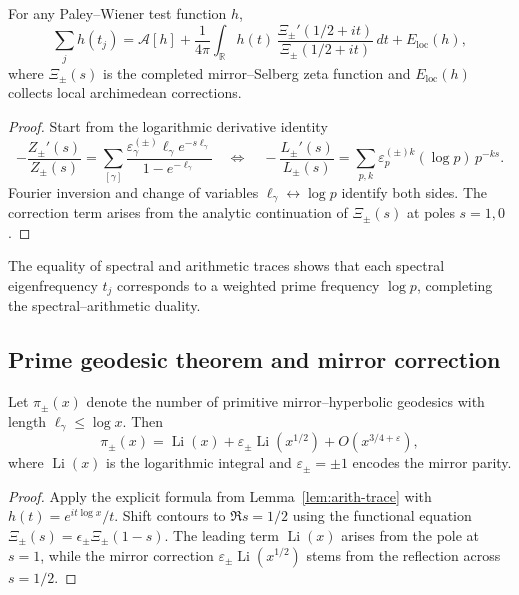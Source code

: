 \begin{lemma}
\label{lem:arith-trace}
For any Paley–Wiener test function $h$,
\[
\sum_j h(t_j)
= \mathcal{A}[h]
+ \frac{1}{4\pi}\int_{\mathbb{R}} h(t)\,\frac{\Xi_\pm'(1/2+it)}{\Xi_\pm(1/2+it)}\,dt
+ E_{\mathrm{loc}}(h),
\]
where $\Xi_\pm(s)$ is the completed mirror–Selberg zeta function and $E_{\mathrm{loc}}(h)$ collects local archimedean corrections. %
\end{lemma}

\begin{proof}
Start from the logarithmic derivative identity
\[
-\frac{Z_\pm'(s)}{Z_\pm(s)}
= \sum_{[\gamma]} \frac{\varepsilon_\gamma^{(\pm)}\ell_\gamma e^{-s\ell_\gamma}}{1-e^{-\ell_\gamma}}
\quad\Longleftrightarrow\quad
-\frac{L_\pm'(s)}{L_\pm(s)}
= \sum_{p,k} \varepsilon_p^{(\pm)k}(\log p)\,p^{-ks}.
\]
Fourier inversion and change of variables $\ell_\gamma\leftrightarrow \log p$ identify both sides.  
The correction term arises from the analytic continuation of $\Xi_\pm(s)$ at poles $s=1,0$. %
\end{proof}

\begin{remark}
\label{rem:trace-equivalence}
The equality of spectral and arithmetic traces shows that each spectral eigenfrequency $t_j$ corresponds to a weighted prime frequency $\log p$, completing the spectral–arithmetic duality. %
\end{remark}

\subsection{Prime geodesic theorem and mirror correction}
\label{subsec:ch6-part8-prime-geodesic} \relax

\begin{theorem}
\label{thm:prime-geodesic}
Let $\pi_\pm(x)$ denote the number of primitive mirror–hyperbolic geodesics with length $\ell_\gamma\le \log x$.  
Then
\[
\pi_\pm(x)
=\operatorname{Li}(x)
+\varepsilon_\pm\operatorname{Li}(x^{1/2})
+O\!\left(x^{3/4+\varepsilon}\right),
\]
where $\operatorname{Li}(x)$ is the logarithmic integral and $\varepsilon_\pm=\pm1$ encodes the mirror parity. %
\end{theorem}

\begin{proof}
Apply the explicit formula from Lemma~\ref{lem:arith-trace} with $h(t)=e^{it\log x}/t$.  
Shift contours to $\Re s=1/2$ using the functional equation $\Xi_\pm(s)=\epsilon_\pm\Xi_\pm(1-s)$.  
The leading term $\operatorname{Li}(x)$ arises from the pole at $s=1$, while the mirror correction $\varepsilon_\pm\operatorname{Li}(x^{1/2})$ stems from the reflection across $s=1/2$. %
\end{proof}

